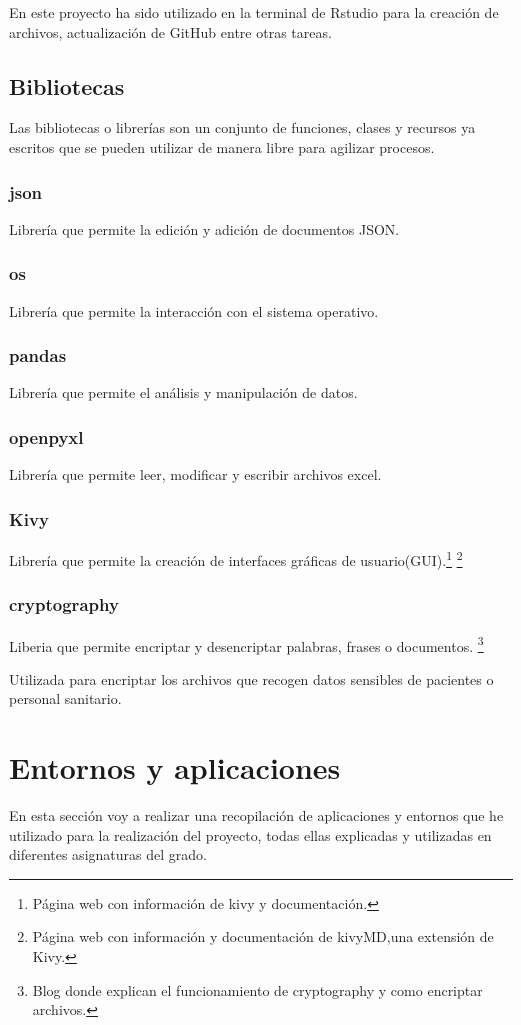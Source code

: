 En este proyecto ha sido utilizado en la terminal de Rstudio para la creación de archivos, actualización de GitHub entre otras tareas.

\subsection{Bibliotecas}
Las bibliotecas o librerías son un conjunto de funciones, clases y recursos ya escritos que se pueden utilizar de manera libre para agilizar procesos. 

\subsubsection{json}
Librería que permite la edición y adición de documentos JSON.
\subsubsection{os}
Librería que permite la interacción con el sistema operativo.
\subsubsection{pandas}
Librería que permite el análisis y manipulación de datos.
\subsubsection{openpyxl}
Librería que permite leer, modificar y escribir archivos excel.
\subsubsection{Kivy}
Librería que permite la creación de interfaces gráficas de usuario(GUI).\cite{kivy}\footnote{Página web con información de kivy y documentación\cite{kivy}.}
\cite{KivyMD}\footnote{Página web con información y documentación de kivyMD,una extensión de Kivy\cite{KivyMD}.}
\subsubsection{cryptography}

Liberia que permite encriptar y desencriptar palabras, frases o documentos. \cite{ruh_encriptar_2023}\footnote{Blog donde explican el funcionamiento de cryptography y como encriptar archivos\cite{ruh_encriptar_2023}.}

Utilizada para encriptar los archivos que recogen datos sensibles de pacientes o personal sanitario.
\section{Entornos y aplicaciones}
En esta sección voy a realizar una recopilación de aplicaciones y entornos que he utilizado para la realización del proyecto, todas ellas explicadas y utilizadas en diferentes asignaturas del grado.
